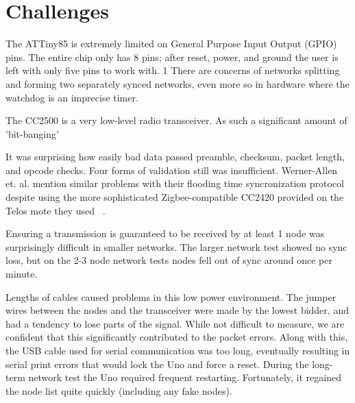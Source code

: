 \section{Challenges}
\label{section:challenges}

The ATTiny85 is extremely limited on General Purpose Input Output (GPIO) pins. The entire chip only has 8 pins; after reset, power, and ground the user is left with only five pins to work with. 1
There are concerns of networks splitting and forming two separately synced networks, even more so in hardware where the watchdog is an imprecise timer.

The CC2500 is a very low-level radio transceiver. As such a significant amount of 'bit-banging' 

It was surprising how easily bad data passed preamble, checksum, packet length, and opcode checks. Four forms of validation still was insufficient. Werner-Allen et. al.  mention similar problems with their flooding time syncronization protocol despite using the more sophisticated Zigbee-compatible CC2420 provided on the Telos mote they used ~\cite{wernerallen}. 

Ensuring a transmission is guaranteed to be received by at least 1 node was surprisingly difficult in smaller networks. The larger network test showed no sync loss, but on the 2-3 node network tests nodes fell out of sync around once per minute.

Lengths of cables caused problems in this low power environment. The jumper wires between the nodes and the transceiver were made by the lowest bidder, and had a tendency to lose parts of the signal. While not difficult to measure, we are confident that this significantly contributed to the packet errors. Along with this, the USB cable used for serial communication was too long, eventually resulting in serial print errors that would lock the Uno and force a reset. During the long-term network test the Uno required frequent restarting. Fortunately, it regained the node list quite quickly (including any fake nodes).